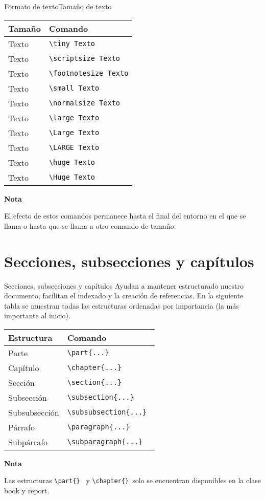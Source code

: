 \documentclass[10pt,xcolor={dvipsnames}]{beamer}
\begin{document}
\begin{frame}{Formato de texto}{Tamaño de texto}
\begin{center}
	\begin{tabular}{ll}
		Tamaño & Comando \\
		\hline
		\tiny Texto & {\tt\textbackslash tiny Texto}\\ 
		\scriptsize Texto & {\tt\textbackslash scriptsize Texto}\\
		\footnotesize Texto & {\tt\textbackslash footnotesize Texto}\\
		\small Texto & {\tt\textbackslash small Texto}\\
		\normalsize Texto & {\tt\textbackslash normalsize Texto} \\
		\large Texto & {\tt\textbackslash large Texto}\\
		\Large Texto & {\tt\textbackslash Large Texto}\\
		\LARGE Texto & {\tt\textbackslash LARGE Texto}\\
		\huge Texto & {\tt\textbackslash huge Texto}\\
		\Huge Texto & {\tt\textbackslash Huge Texto}\\
	\end{tabular}
\end{center}
\textbf{Nota}

El efecto de estos comandos permanece hasta el final del entorno en el que se llama o hasta que se llama a otro comando de tamaño.
\end{frame}

\section{Secciones, subsecciones y capítulos}
\begin{frame}{Secciones, subsecciones y capítulos}{}
Ayudan a mantener estructurado nuestro documento, facilitan el indexado y la creación de referencias. En la siguiente tabla se muestran todas las estructuras ordenadas por importancia (la más importante al inicio).
\begin{center}
	\begin{tabular}{ll}
		Estructura & Comando \\
		\hline
		Parte & {\tt\textbackslash part\{...\} }\\ 
		Capítulo & {\tt\textbackslash chapter\{...\} }\\
		Sección & {\tt\textbackslash sect\textit{}ion\{...\} }\\
		Subsección & {\tt\textbackslash subsection\{...\} }\\
		Subsubsección & {\tt\textbackslash subsubsection\{...\} }\\
		Párrafo & {\tt\textbackslash paragraph\{...\} }\\
		Subpárrafo & {\tt\textbackslash subparagraph\{...\} }\\
	\end{tabular}
\end{center}
\textbf{Nota}

Las estructuras {\tt\textbackslash part\{\} } y {\tt\textbackslash chapter\{\} }solo se encuentran disponibles en la clase book y report.
\end{frame}
\end{document}
